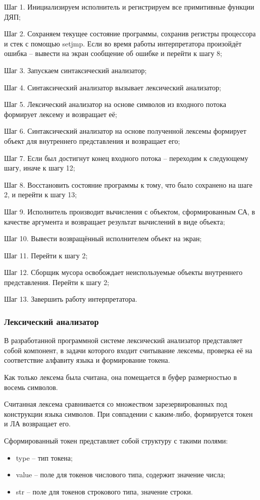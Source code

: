 Шаг 1. Инициализируем исполнитель и регистрируем все примитивные функции ДЯП;

Шаг 2. Сохраняем текущее состояние программы, сохранив регистры процессора и стек с помощью setjmp. Если во время работы интерпретатора произойдёт ошибка -- вывести на экран сообщение об ошибке и перейти к шагу 8;

Шаг 3. Запускаем синтаксический анализатор;

Шаг 4. Синтаксический анализатор вызывает лексический анализатор;

Шаг 5. Лексический анализатор на основе символов из входного потока формирует лексему и возвращает её;

Шаг 6. Синтаксический анализатор на основе полученной лексемы формирует объект для внутреннего представления и возвращает его;

Шаг 7. Если был достигнут конец входного потока -- переходим к следующему шагу, иначе к шагу 12;

Шаг 8. Восстановить состояние программы к тому, что было сохранено на шаге 2, и перейти к шагу 13;

Шаг 9. Исполнитель производит вычисления с объектом, сформированным СА, в качестве аргумента и возвращает результат вычислений в виде объекта;

Шаг 10. Вывести возвращённый исполнителем объект на экран;

Шаг 11. Перейти к шагу 2;

Шаг 12. Сборщик мусора освобождает неиспользуемые объекты внутреннего представления. Перейти к шагу 2;

Шаг 13. Завершить работу интерпретатора.

\subsubsection{Лексический анализатор}
В разработанной программной системе лексический анализатор представляет собой компонент, в задачи которого входит считывание лексемы, проверка её на соответствие алфавиту языка и формирование токена.

Как только лексема была считана, она помещается в буфер размерностью в восемь символов.

Считанная лексема сравнивается со множеством зарезервированных под конструкции языка символов. При совпадении с каким-либо, формируется токен и ЛА возвращает его.


Сформированный токен представляет собой структуру с такими полями:
\begin{itemize}
	\item type -- тип токена;
	\item value -- поле для токенов числового типа, содержит значение числа;
	\item str -- поле для токенов строкового типа, значение строки.
\end{itemize}

